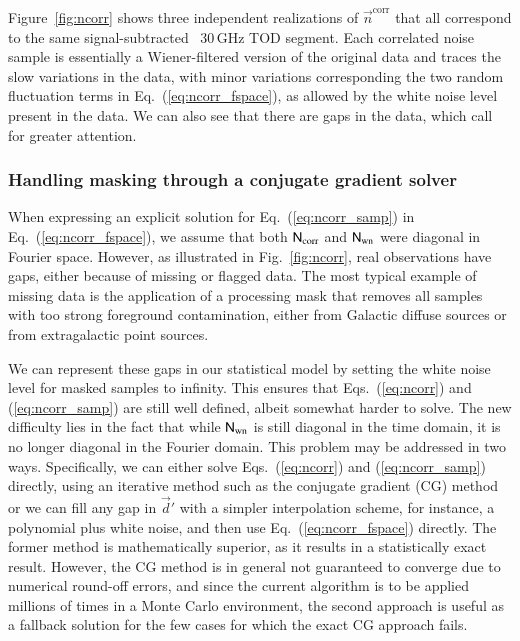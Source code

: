 \documentclass{aa}
\begin{document}
Figure~\ref{fig:ncorr} shows three independent
realizations of $\vec{n}^\mathrm{corr}$ that all correspond to the
same signal-subtracted \Planck\ 30\,GHz TOD segment. Each correlated
noise sample is essentially a Wiener-filtered version of the original
data and traces the slow variations in the data, with minor
variations corresponding the two random fluctuation terms in
Eq.~(\ref{eq:ncorr_fspace}), as allowed by the white noise level
present in the data. We can also see that there are gaps in the data, 
which call for greater attention.

\subsubsection{Handling masking through a conjugate gradient solver}
When expressing an explicit solution for Eq.~(\ref{eq:ncorr_samp}) in
Eq.~(\ref{eq:ncorr_fspace}), we assume that both
$\mathsf{N}_\mathrm{corr}$ and $\mathsf{N}_\mathrm{wn}$ were diagonal in
Fourier space. However, as illustrated in Fig.~\ref{fig:ncorr}, real
observations have gaps, either because of missing or flagged data. The
most typical example of missing data is the application of a
processing mask that removes all samples with too strong foreground
contamination, either from Galactic diffuse sources or from
extragalactic point sources.

We can represent these gaps in our statistical model by setting the
white noise level for masked samples to infinity. This ensures that
Eqs.~(\ref{eq:ncorr}) and (\ref{eq:ncorr_samp}) are still well
defined, albeit somewhat harder to solve. The new difficulty lies in
the fact that while $\mathsf{N}_\mathrm{wn}$ is still diagonal in
the time domain, it is no longer diagonal in the Fourier domain. This problem
may be addressed in two ways. Specifically, we can either solve
Eqs.~(\ref{eq:ncorr}) and (\ref{eq:ncorr_samp}) directly, using an
iterative method such as the conjugate gradient (CG) method
\citep{wehus:2012,bp02} or we can fill any gap in $\vec{d}'$ with a
simpler interpolation scheme, for instance, a polynomial plus white
noise, and then use Eq.~(\ref{eq:ncorr_fspace}) directly. The former method is mathematically superior, as it results in a
statistically exact result. However, the CG method is in general not
guaranteed to converge due to numerical round-off errors, and since the 
current algorithm is to be
applied millions of times in a Monte Carlo environment, the second
approach is useful as a fallback solution for the few cases for which the
exact CG approach fails. 
\end{document}
